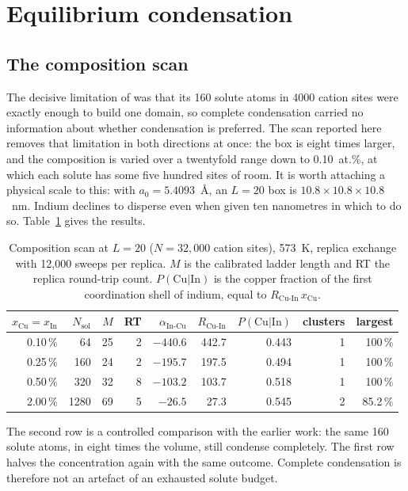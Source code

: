 \documentclass[11pt,a4paper]{article}
\newcommand{\aInCu}{\alpha_{\mathrm{In\text{-}Cu}}}
\newcommand{\RCuIn}{R_{\mathrm{Cu\text{-}In}}}
\newcommand{\Nsol}{N_{\mathrm{sol}}}
\begin{document}
\section{Equilibrium condensation}
\label{sec:condensation}

\subsection{The composition scan}
\label{sec:scan}

The decisive limitation of \citet{yu2026} was that its 160 solute atoms in 4000
cation sites were exactly enough to build one domain, so complete condensation
carried no information about whether condensation is preferred. The scan
reported here removes that limitation in both directions at once: the box is
eight times larger, and the composition is varied over a twentyfold range down
to 0.10~at.\%, at which each solute has some five hundred sites of room. It is
worth attaching a physical scale to this: with $a_0 = 5.4093$~\AA{}, an
$L = 20$ box is $10.8 \times 10.8 \times 10.8$~nm. Indium declines to disperse
even when given ten nanometres in which to do so.
Table~\ref{tab:scan} gives the results.

\begin{table}[htbp]
\centering
\caption{Composition scan at $L = 20$ ($N = 32{,}000$ cation sites), 573~K,
replica exchange with 12{,}000 sweeps per replica. $M$ is the calibrated ladder
length and RT the replica round-trip count. $P(\mathrm{Cu}|\mathrm{In})$ is the
copper fraction of the first coordination shell of indium, equal to
$\RCuIn \, x_{\mathrm{Cu}}$.}
\label{tab:scan}
\small
\begin{tabular}{rrrrrrrrr}
\toprule
$x_{\mathrm{Cu}}=x_{\mathrm{In}}$ & $\Nsol$ & $M$ & RT & $\aInCu$ & $\RCuIn$ &
$P(\mathrm{Cu}|\mathrm{In})$ & clusters & largest \\
\midrule
0.10\,\% &   64 & 25 & 2 & $-440.6$ & 442.7 & 0.443 & 1 & 100\,\% \\
0.25\,\% &  160 & 24 & 2 & $-195.7$ & 197.5 & 0.494 & 1 & 100\,\% \\
0.50\,\% &  320 & 32 & 8 & $-103.2$ & 103.7 & 0.518 & 1 & 100\,\% \\
2.00\,\% & 1280 & 69 & 5 & $ -26.5$ &  27.3 & 0.545 & 2 & 85.2\,\% \\
\bottomrule
\end{tabular}
\end{table}

The second row is a controlled comparison with the earlier work: the same 160
solute atoms, in eight times the volume, still condense completely. The first
row halves the concentration again with the same outcome. Complete condensation
is therefore not an artefact of an exhausted solute budget.
\end{document}
